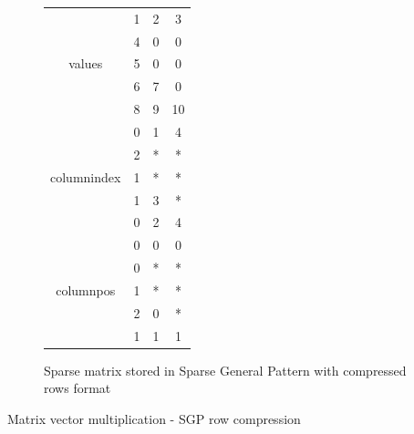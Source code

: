 \begin{figure}[h]
\centering
\begin{tabular}{c|ccc|}
	\cline{2-4}
	  \multirow{5}{*}{values}    & 1 & 2 & 3  \\
	                             & 4 & 0 & 0  \\
	                             & 5 & 0 & 0  \\
	                             & 6 & 7 & 0  \\
	                             & 8 & 9 & 10 \\ \cline{2-4}
	\multirow{5}{*}{columnindex} & 0 & 1 & 4  \\
	                             & 2 & * & *  \\
	                             & 1 & * & *  \\
	                             & 1 & 3 & *  \\
	                             & 0 & 2 & 4  \\ \cline{2-4}
	 \multirow{5}{*}{columnpos}  & 0 & 0 & 0  \\
	                             & 0 & * & *  \\
	                             & 1 & * & *  \\
	                             & 2 & 0 & *  \\
	                             & 1 & 1 & 1  \\ \cline{2-4}
\end{tabular}
\caption{Sparse matrix stored in Sparse General Pattern with compressed rows format \label{fig:methods:sgpr_ex}}
\end{figure}

\begin{algorithm}[h]
	\DontPrintSemicolon
	\caption{Matrix vector multiplication - SGP row compression\label{fig:methods:sgpr_algo}}
\end{algorithm}

